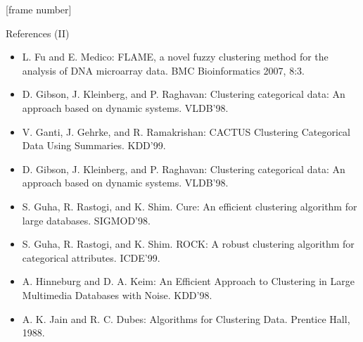 \documentclass[aspectratio=169,t,xcolor=dvipsnames]{beamer}
\begin{document}
  {
    [frame number]
    \begin{frame}{References (II)}
        \begin{itemize}
          \item L. Fu and E. Medico: FLAME, a novel fuzzy clustering method for the analysis of DNA microarray data. BMC Bioinformatics 2007, 8:3.
          \item D. Gibson, J. Kleinberg, and P. Raghavan: Clustering categorical data: An approach based on dynamic systems. VLDB'98.
          \item V. Ganti, J. Gehrke, and R. Ramakrishan: CACTUS Clustering Categorical Data Using Summaries. KDD'99.
          \item D. Gibson, J. Kleinberg, and P. Raghavan: Clustering categorical data: An approach based on dynamic systems. VLDB'98.
          \item S. Guha, R. Rastogi, and K. Shim. Cure: An efficient clustering algorithm for large databases. SIGMOD'98.
          \item S. Guha, R. Rastogi, and K. Shim. ROCK: A robust clustering algorithm for categorical attributes. ICDE'99.
          \item A. Hinneburg and D. A. Keim: An Efficient Approach to Clustering in Large Multimedia Databases with Noise. KDD'98.
          \item A. K. Jain and R. C. Dubes: Algorithms for Clustering Data. Prentice Hall, 1988.
        \end{itemize}
    \end{frame}
  }
\end{document}
